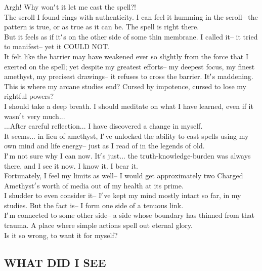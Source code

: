 \documentclass[12pt]{article}
\begin{document}
  
    Argh! Why won$\rq$t it let me cast the spell?!\\The scroll I found rings with authenticity. I can feel it humming in the scroll-- the pattern is true, or as true as it can be. The spell is right there.\\But it feels as if it$\rq$s on the other side of some thin membrane. I called it-- it tried to manifest-- yet it COULD NOT.\\


  
    It felt like the barrier may have weakened ever so slightly from the force that I exerted on the spell; yet despite my greatest efforts-- my deepest focus, my finest amethyst, my precisest drawings-- it refuses to cross the barrier. It$\rq$s maddening.\\This is where my arcane studies end? Cursed by impotence, cursed to lose my rightful powers?\\I should take a deep breath. I should meditate on what I have learned, even if it wasn$\rq$t very much...\\


  
    ...After careful reflection... I have discovered a change in myself.\\It seems... in lieu of amethyst, I$\rq$ve unlocked the ability to cast spells using my own mind and life energy-- just as I read of in the legends of old.\\I$\rq$m not sure why I can now. It$\rq$s just... the truth-knowledge-burden was always there, and I see it now. I know it. I bear it.\\Fortunately, I feel my limits as well-- I would get approximately two Charged Amethyst$\rq$s worth of media out of my health at its prime.\\


  
    I shudder to even consider it-- I$\rq$ve kept my mind mostly intact so far, in my studies. But the fact is-- I form one side of a tenuous link.\\I$\rq$m connected to some other side-- a side whose boundary has thinned from that trauma. A place where simple actions spell out eternal glory.\\Is it so wrong, to want it for myself?\\

\newpage

\label{sec:basics/start_to_see}
\subsection*{WHAT DID I SEE}
\end{document}
